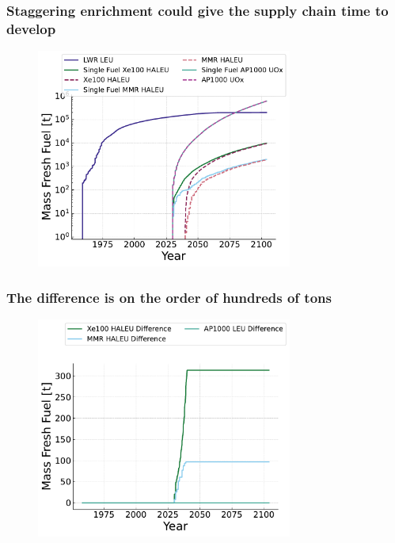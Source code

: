 \documentclass[9pt]{beamer}
\begin{document}
  \begin{frame}
    \frametitle{Staggering enrichment could give the supply chain time to develop}
    \begin{figure}
        \centering
        \includegraphics[width=0.75\textwidth]{./images/fresh_fuel.pdf}
    \end{figure}
  \end{frame}

  \begin{frame}
    \frametitle{The difference is on the order of hundreds of tons}
    \begin{figure}
        \centering
        \includegraphics[width=0.75\textwidth]{./images/fresh_fuel_difference.pdf}
    \end{figure}
  \end{frame}
\end{document}
